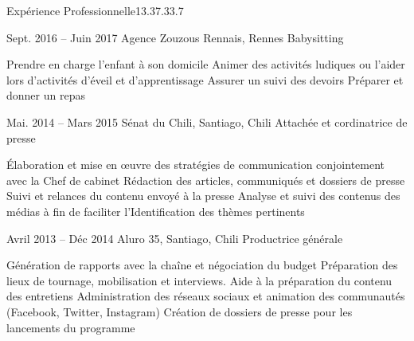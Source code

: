\documentclass[30pt, french]{tccv}
\begin{document}
\begin{upshape}
\begin{flat_frame}{Expérience Professionnelle}{13.3}{7.3}{3.7}{}
\begin{eventlist}
\setlength{\parskip}{0pt}    
\item{Sept. 2016 -- Juin 2017 }     
  {Agence Zouzous Rennais, Rennes}     
  {Babysitting}
     \fontsize{9pt}{1em}\color{text}\bodyfontlight\upshape\selectfont

\begin{itemize}
      \cvitem[\checkmark]  Prendre en charge l’enfant à son domicile                                    
      \cvitem[\checkmark]  Animer des activités ludiques ou l’aider lors d’activités d’éveil et d’apprentissage                                            
      \cvitem[\checkmark]  Assurer un suivi des devoirs
      \cvitem[\checkmark]  Préparer et donner un repas

\end{itemize}       





  
\setlength{\parskip}{0pt}
\item{Mai. 2014 -- Mars 2015 }     
  {Sénat du Chili, Santiago, Chili}     
  {Attachée et cordinatrice de presse}
  \fontsize{9pt}{1em}\color{text}\bodyfontlight\upshape\selectfont

  
\begin{itemize}
      \cvitem[\checkmark] Élaboration et mise en œuvre des stratégies de communication conjointement avec la Chef de cabinet
      \cvitem[\checkmark] Rédaction des articles, communiqués et dossiers de presse
      \cvitem[\checkmark] Suivi et relances du contenu envoyé à la presse
      \cvitem[\checkmark] Analyse et suivi des contenus des médias à fin de faciliter l'Identification des thèmes pertinents
\end{itemize}        




\setlength{\parskip}{0pt}
\item{Avril 2013 -- Déc 2014 }     
  {Aluro 35, Santiago, Chili}     
  {Productrice générale}
\fontsize{9pt}{1em}\color{text}\bodyfontlight\upshape\selectfont

    
\begin{itemize}
      \cvitem[\checkmark] Génération de rapports avec la chaîne et négociation du budget                   
      \cvitem[\checkmark] Préparation des lieux de tournage, mobilisation et interviews. Aide à la préparation du contenu des entretiens   
      \cvitem[\checkmark] Administration des réseaux sociaux et animation des communautés (Facebook, Twitter, Instagram)                                                                    
      \cvitem[\checkmark] Création de dossiers de presse pour les lancements du programme      
\end{itemize}      
  



\end{eventlist}
\end{flat_frame}
\end{upshape}
\end{document}
